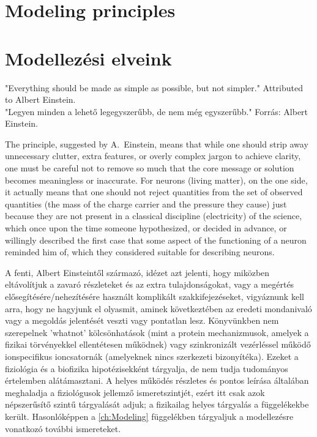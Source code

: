 

\ifx\magyar\undefined
\section[Modeling principles]{Modeling principles\label{sec:V2-0_ModelingPrinciples}}
\else

\section[Modellezési elveink]{Modellezési elveink\label{sec:V2-0_ModelingPrinciples}}
\fi



\ifx\magyar\undefined
\quotationbox
{
"Everything should be made as simple as possible, but not simpler." Attributed to Albert Einstein.\\
}
\else
\quotationbox
{
"Legyen minden a lehető legegyszerűbb, de nem még egyszerűbb." Forrás: Albert Einstein.\\
}
\fi

\ifx\magyar\undefined
The principle, suggested by A.~Einstein, means that while one should strip away unnecessary clutter, extra features, or overly complex jargon to achieve clarity, one must be careful not to remove so much that the core message or solution becomes meaningless or inaccurate.
For neurons (living matter), on the one side, it actually means that one should not reject quantities from the set of observed quantities
(the mass of the charge carrier and the pressure they cause) 
just because they are not present in a classical discipline (electricity) of the science,
which once upon the time someone hypothesized,
or decided in advance, or willingly described the first case that some aspect of the functioning of a neuron reminded him of, which they considered suitable for describing neurons.

\else

A fenti, Albert Einsteintől származó, idézet azt jelenti,
hogy miközben eltávolítjuk a zavaró részleteket és 
az extra tulajdonságokat, vagy a megértés elősegítésére/nehezítésére használt komplikált
szakkifejezéseket, vigyáznunk kell arra, hogy ne hagyjunk el olyasmit,
aminek következtében az eredeti mondanivaló vagy a megoldás 
jelentését veszti vagy pontatlan lesz.
Könyvünkben nem szerepelnek 'whatnot' kölcsönhatások (mint a protein mechanizmusok, amelyek a fizikai törvényekkel ellentétesen működnek) vagy szinkronizált vezérléssel működő ionspecifikus ioncsatornák (amelyeknek nincs szerkezeti bizonyítéka). Ezeket a fiziológia és a biofizika hipotézisekként tárgyalja, de nem tudja tudományos értelemben alátámasztani. A helyes működés részletes és pontos leírása általában
meghaladja a fiziológusok jellemző ismeretszintjét, ezért itt csak azok népszerűsítő szintű tárgyalását adjuk; a fizikailag helyes tárgyalás a függelékekbe került.
Hasonlóképpen a \ref{ch:Modeling} függelékben tárgyaljuk a modellezésre vonatkozó további ismereteket.
\fi


